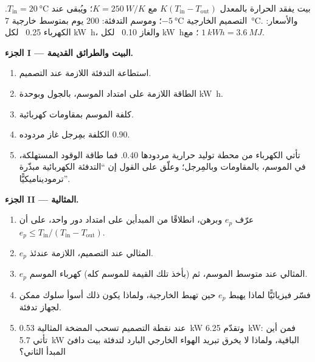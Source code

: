 \begin{problem}
\label{pb:b1:heat-engines:1}
بيت يفقد الحرارة بالمعدل $K(T_{\mathrm{in}} - T_{\mathrm{out}})$ مع
$K = \qty{250}{W/K}$؛ ويُبقى عند $T_{\mathrm{in}} = \qty{20}{\degreeCelsius}$.
 التصميم الخارجية $\qty{-5}{\degreeCelsius}$؛ وموسم التدفئة:
$200$ يوم بمتوسط  خارجية \qty{7}{\degreeCelsius}.
والأسعار: الكهرباء 0.25~\texteuro{} لكل \unit{kW h}، والغاز 0.10~\texteuro{} لكل
\unit{kW h}؛ مع $\qty{1}{kW h} = \qty{3.6}{MJ}$.

\medskip
\noindent\textbf{الجزء I --- البيت والطرائق القديمة.}
\begin{enumerate}
  \item استطاعة التدفئة اللازمة عند  التصميم.
  \item الطاقة اللازمة على امتداد الموسم، بالجول وبوحدة \unit{kW h}.
  \item كلفة الموسم بمقاومات كهربائية.
  \item الكلفة بمِرجل غاز مردوده $0.90$.
  \item تأتي الكهرباء من محطة توليد حرارية مردودها
        $0.40$. فما طاقة الوقود المستهلكة، في الموسم، بالمقاومات
        وبالمِرجل؛ وعلّق على القول إن ``التدفئة الكهربائية مبذّرة
        ترموديناميكيًّا''.
\end{enumerate}

\medskip
\noindent\textbf{الجزء II ---  المثالية.}
\begin{enumerate}[resume]
  \item عرّف $e_p$ وبرهن، انطلاقًا من المبدأين على امتداد دور واحد، على أن
        $e_p \leq T_{\mathrm{in}}/(T_{\mathrm{in}} - T_{\mathrm{out}})$.
  \item $e_p$ المثالي عند  التصميم، 
        اللازمة عندئذ.
  \item $e_p$ المثالي عند متوسط  الموسم، ثم (بأخذ تلك
        القيمة للموسم كله) كهرباء الموسم.
  \item فسّر فيزيائيًّا لماذا يهبط $e_p$ حين تهبط 
        الخارجية، ولماذا يكون ذلك أسوأ سلوك ممكن لجهاز
        تدفئة.
  \item عند نقطة التصميم تسحب المضخة المثالية \qty{0.53}{kW} وتقدّم
        \qty{6.25}{kW}: فمن أين تأتي \qty{5.7}{kW} الباقية،
        ولماذا لا يخرق تبريد الهواء الخارجي البارد لتدفئة بيت دافئ
        المبدأ الثاني؟
\end{enumerate}


\end{problem}
